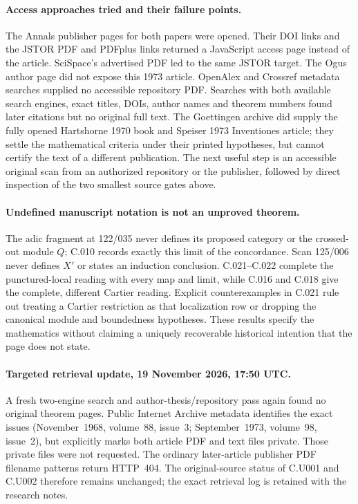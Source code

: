 \paragraph{Access approaches tried and their failure points.}
The Annals publisher pages for both papers were opened. Their
DOI links and the JSTOR PDF and PDFplus links returned a
JavaScript access page instead of the article. SciSpace's
advertised PDF led to the same JSTOR target. The Ogus author
page did not expose this 1973 article. OpenAlex and Crossref
metadata searches supplied no accessible repository PDF.
Searches with both available search engines, exact titles,
DOIs, author names and theorem numbers found later citations
but no original full text. The Goettingen archive did supply
the fully opened Hartshorne 1970 book and Speiser 1973
Inventiones article; they settle the mathematical criteria
under their printed hypotheses, but cannot certify the text
of a different publication. The next useful step is an
accessible original scan from an authorized repository or
the publisher, followed by direct inspection of the two
smallest source gates above.

\paragraph{Undefined manuscript notation is not an unproved theorem.}
The adic fragment at 122/035 never defines its proposed category
or the crossed-out module $Q$; C.010 records exactly this limit
of the concordance. Scan 125/006 never defines $X'$ or states
an induction conclusion. C.021--C.022 complete the
punctured-local reading with every map and limit, while
C.016 and C.018 give the complete, different Cartier reading.
Explicit counterexamples in C.021 rule out treating a Cartier
restriction as that localization row or dropping the canonical
module and boundedness hypotheses. These results specify the
mathematics without claiming a uniquely recoverable historical
intention that the page does not state.

\paragraph{Targeted retrieval update, 19 November 2026, 17:50 UTC.}
A fresh two-engine search and author-thesis/repository pass again
found no original theorem pages. Public Internet Archive metadata
identifies the exact issues (November~1968, volume~88, issue~3;
September~1973, volume~98, issue~2), but explicitly marks both
article PDF and text files private. Those private files were not
requested. The ordinary later-article publisher PDF filename
patterns return HTTP~404. The original-source status of C.U001
and C.U002 therefore remains unchanged; the exact retrieval log
is retained with the research notes.
